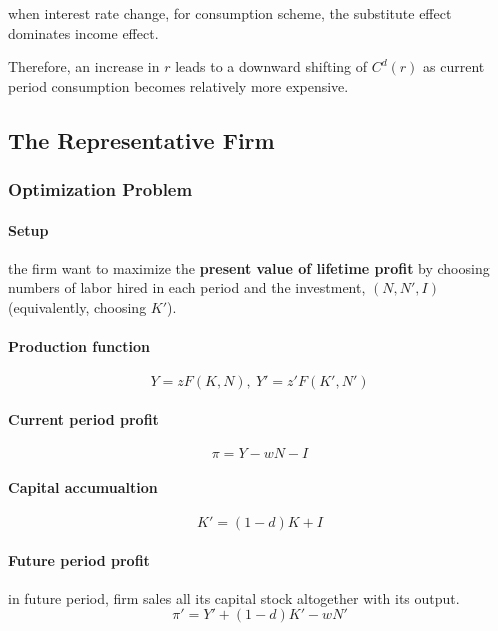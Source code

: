 \documentclass[11pt]{article}
\begin{document}
			\begin{assumption}
				when interest rate change, for consumption scheme, the substitute effect dominates income effect.
			\end{assumption}
			\par Therefore, an increase in $r$ leads to a downward shifting of $C^d(r)$ as current period consumption becomes relatively more expensive.
			
			\subsection{The Representative Firm}
				\subsubsection{Optimization Problem}
				\paragraph{Setup} the firm want to maximize the \textbf{present value of lifetime profit} by choosing numbers of labor hired in each period and the investment, $(N,N',I)$ (equivalently, choosing $K'$).
				\paragraph{Production function}
					\begin{equation}
						Y = z F(K, N),\ Y' = z' F(K', N')
					\end{equation}
				\paragraph{Current period profit}
					\begin{equation}
						\pi = Y - wN - I
					\end{equation}
				\paragraph{Capital accumualtion}
					\begin{equation}
						K' = (1-d) K + I
					\end{equation}
				\paragraph{Future period profit} in future period, firm sales all its capital stock altogether with its output.
					\begin{equation}
						\pi' = Y' + (1-d)K' - wN'
					\end{equation}
\end{document}
